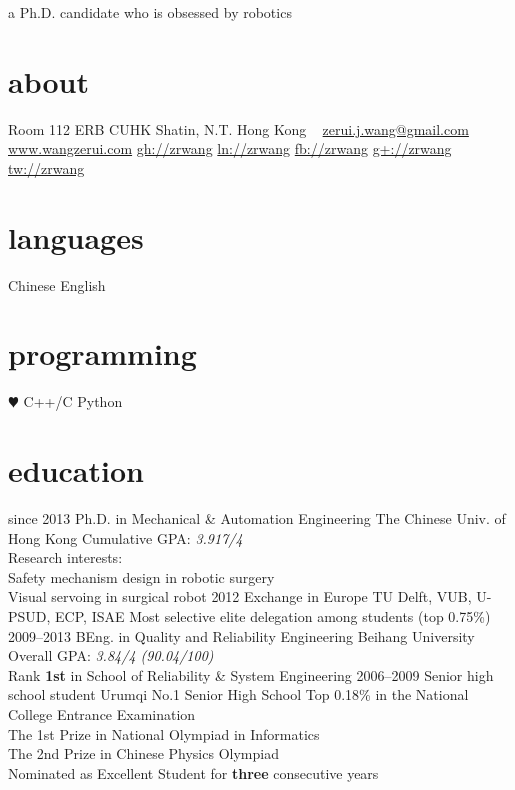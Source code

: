 \documentclass[]{friggeri-cv}
\begin{document}
       {a Ph.D. candidate who is obsessed by robotics}


\begin{aside}
  \section{about}
    Room 112
    ERB
    CUHK
    Shatin, N.T.
    Hong Kong
    ~
    \href{mailto:zerui.j.wang@gmail.com}{zerui.j.wang@gmail.com}
    \href{http://www.wangzerui.com}{www.wangzerui.com}
    \href{https://github.com/zrwang}{gh://zrwang}
    \href{https://www.linkedin.com/in/zrwang}{ln://zrwang}
    \href{https://www.facebook.com/zrwang.cuhk}{fb://zrwang}
    \href{https://plus.google.com/u/0/115306810481973645007/posts}{g+://zrwang}
    \href{https://twitter.com/wangzerui}{tw://zrwang}
  \section{languages}
    Chinese
    English
  \section{programming}
    {\color{red} $\varheartsuit$} C++/C
    Python
\end{aside}

\section{education}
\begin{entrylist}
  \entry
    {since 2013}
    {Ph.D. {\normalfont in Mechanical \& Automation Engineering}}
    {The Chinese Univ. of Hong Kong}
    {Cumulative GPA: \emph{3.917/4} \\
     Research interests: \\
     Safety mechanism design in robotic surgery \\
     Visual servoing in surgical robot}
  \entry
    {2012}
    {Exchange {\normalfont in Europe}}
    {TU Delft, VUB, U-PSUD, ECP, ISAE}
    {Most selective elite delegation among students (top 0.75\%)}
  \entry
    {2009–2013}
    {BEng. {\normalfont in Quality and Reliability Engineering}}
    {Beihang University}
    {Overall GPA: \emph{3.84/4 (90.04/100)} \\
     Rank \textbf{1st} in School of Reliability \& System Engineering}
  \entry
    {2006–2009}
    {Senior high school student}
    {Urumqi No.1 Senior High School}
    {Top 0.18\%  in the National College Entrance Examination \\
    The 1st Prize in National Olympiad in Informatics \\
    The 2nd Prize in Chinese Physics Olympiad \\
    Nominated as Excellent Student for \textbf{three} consecutive years}
\end{entrylist}
\end{document}
